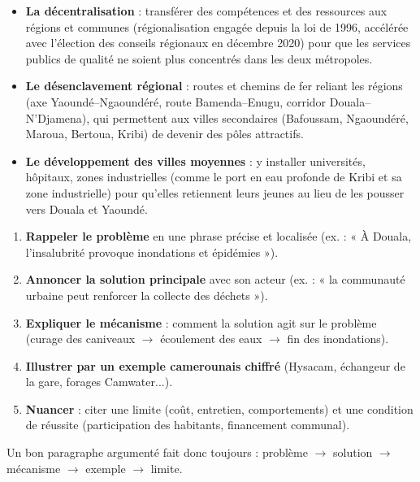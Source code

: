 \documentclass[11pt]{article}
\begin{document}
\begin{itemize}
\item \textbf{La décentralisation} : transférer des compétences et des ressources aux régions et communes (régionalisation engagée depuis la loi de 1996, accélérée avec l'élection des conseils régionaux en décembre 2020) pour que les services publics de qualité ne soient plus concentrés dans les deux métropoles.
\item \textbf{Le désenclavement régional} : routes et chemins de fer reliant les régions (axe Yaoundé--Ngaoundéré, route Bamenda--Enugu, corridor Douala--N'Djamena), qui permettent aux villes secondaires (Bafoussam, Ngaoundéré, Maroua, Bertoua, Kribi) de devenir des pôles attractifs.
\item \textbf{Le développement des villes moyennes} : y installer universités, hôpitaux, zones industrielles (comme le port en eau profonde de Kribi et sa zone industrielle) pour qu'elles retiennent leurs jeunes au lieu de les pousser vers Douala et Yaoundé.
\end{itemize}

\begin{methode}
\begin{enumerate}
\item \textbf{Rappeler le problème} en une phrase précise et localisée (ex. : « À Douala, l'insalubrité provoque inondations et épidémies »).
\item \textbf{Annoncer la solution principale} avec son acteur (ex. : « la communauté urbaine peut renforcer la collecte des déchets »).
\item \textbf{Expliquer le mécanisme} : comment la solution agit sur le problème (curage des caniveaux $\rightarrow$ écoulement des eaux $\rightarrow$ fin des inondations).
\item \textbf{Illustrer par un exemple camerounais chiffré} (Hysacam, échangeur de la gare, forages Camwater...).
\item \textbf{Nuancer} : citer une limite (coût, entretien, comportements) et une condition de réussite (participation des habitants, financement communal).
\end{enumerate}
Un bon paragraphe argumenté fait donc toujours : problème $\rightarrow$ solution $\rightarrow$ mécanisme $\rightarrow$ exemple $\rightarrow$ limite.
\end{methode}
\end{document}
